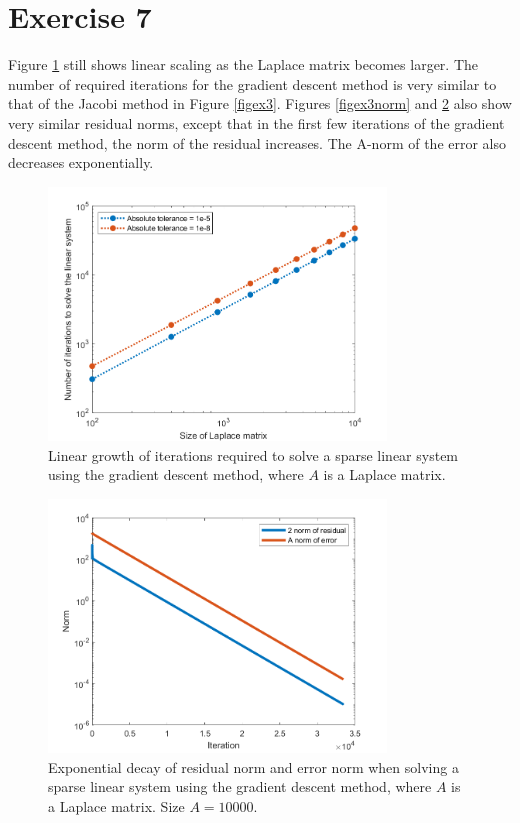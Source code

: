\documentclass{article}
\begin{document}
\section*{Exercise 7}
Figure \ref{figex7} still shows linear scaling as the Laplace matrix becomes larger. The number of required iterations for the gradient descent method is very similar to that of the Jacobi method in Figure \ref{figex3}. Figures \ref{figex3norm} and \ref{figex7norm} also show very similar residual norms, except that in the first few iterations of the gradient descent method, the norm of the residual increases. The A-norm of the error also decreases exponentially.
\begin{figure}[H]
	\centering
	\includegraphics[width=0.8\textwidth]{ex7.png}
	\caption{Linear growth of iterations required to solve a sparse linear system using the gradient descent method,  where $A$ is a Laplace matrix.}
	\label{figex7}
\end{figure}
\begin{figure}[H]
	\centering
	\includegraphics[width=0.8\textwidth]{ex7_norm.png}
	\caption{Exponential decay of residual norm and error norm when solving a sparse linear system using the gradient descent method, where $A$ is a Laplace matrix. Size $A = 10000$.}
	\label{figex7norm}
\end{figure}
\end{document}
